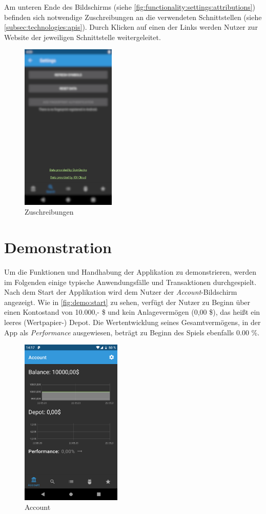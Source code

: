 \documentclass[a4paper]{article}
\begin{document}
Am unteren Ende des Bildschirms (siehe \autoref{fig:functionality:settings:attributions}) befinden sich notwendige Zuschreibungen an die verwendeten Schnittstellen (siehe \autoref{subsec:technologies:apis}).
Durch Klicken auf einen der Links werden Nutzer zur Website der jeweiligen Schnittstelle weitergeleitet.

\begin{figure}[H]
    \centering
    \includegraphics[width=.5\textwidth,height=8cm,keepaspectratio]{./images/settings/attribution.png}
    \caption{Zuschreibungen}
    \label{fig:functionality:settings:attributions}
\end{figure}


\section{Demonstration}
\label{sec:demo}
Um die Funktionen und Handhabung der Applikation zu demonstrieren, werden im Folgenden einige typische Anwendungsfälle und Transaktionen durchgespielt.
Nach dem Start der Applikation wird dem Nutzer der \textit{Account}-Bildschirm angezeigt.
Wie in \autoref{fig:demo:start} zu sehen, verfügt der Nutzer zu Beginn über einen Kontostand von 10.000,- \$ und kein Anlagevermögen (0,00 \$), das heißt ein leeres (Wertpapier-) Depot.
Die Wertentwicklung seines Gesamtvermögens, in der App als \textit{Performance} ausgewiesen, beträgt zu Beginn des Spiels ebenfalls 0.00 \%.

\begin{figure}[H]
	\centering
	\includegraphics[width=.5\textwidth,height=8cm,keepaspectratio]{./images/demo/start.png}
	\caption{Account}
	\label{fig:demo:start}
\end{figure}
\end{document}
